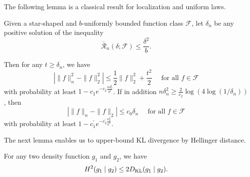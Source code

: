 The following lemma is a classical result for localization and uniform laws. 
\begin{theorem}\label{thm:localization}
Given a star-shaped and $b$-uniformly bounded function class $\mathcal{F}$, let $\delta_n$ be any positive solution of the inequality
$$
\bar{\mathcal{R}}_n(\delta ; \mathcal{F}) \leq \frac{\delta^2}{b} .
$$

Then for any $t \geq \delta_n$, we have
$$
\left|\|f\|_n^2-\|f\|_2^2\right| \leq \frac{1}{2}\|f\|_2^2+\frac{t^2}{2} \quad \text { for all } f \in \mathcal{F}
$$
with probability at least $1-c_1 e^{-c_2 \frac{n \delta_n^2}{b^2}}$. If in addition $n \delta_n^2 \geq \frac{2}{c_2} \log \left(4 \log \left(1 / \delta_n\right)\right)$, then
$$
\left|\|f\|_n-\|f\|_2\right| \leq c_0 \delta_n \quad \text { for all } f \in \mathcal{F}
$$
with probability at least $1-c_1^{\prime} e^{-c_2^{\prime} \frac{n_0^2}{b^2}}$.
\end{theorem}
The next lemma enables us to upper-bound KL divergence by Hellinger distance. 
\begin{lemma}\label{lem:h-kl}
    For any two density function $g_1$ and $g_2$, we have $$
    H^2(g_1\mid g_2) \leq 2 D_{\text{KL}}(g_1\mid g_2).
    $$
\end{lemma}

